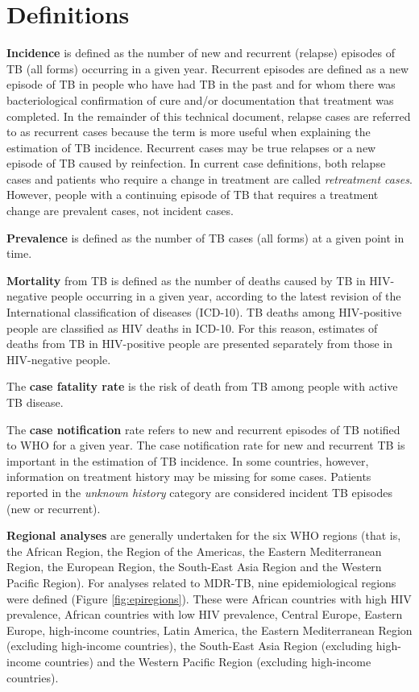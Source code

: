 \section{Definitions}
\textbf{Incidence} is defined as the number of new and recurrent (relapse) episodes of TB (all forms) occurring in a given year. Recurrent episodes are defined as a new episode of TB in people who have had TB in the past and for whom there was bacteriological confirmation of cure and/or documentation that treatment was completed. In the remainder of this technical document, relapse cases are referred to as recurrent cases because the term is more useful when explaining the estimation of TB incidence. Recurrent cases may be true relapses or a new episode of TB caused by reinfection. In current case definitions, both relapse cases and patients who require a change in treatment are called \textit{retreatment cases}. However, people with a continuing episode of TB that requires a treatment change are prevalent cases, not incident cases.

\textbf{Prevalence} is defined as the number of TB cases (all forms) at a given point in time. 

\textbf{Mortality} from TB is defined as the number of deaths caused by TB in HIV-negative people occurring in a given year, according to the latest revision of the International classification of diseases (ICD-10). TB deaths among HIV-positive people are classified as HIV deaths in ICD-10. For this reason, estimates of deaths from TB in HIV-positive people are presented separately from those in HIV-negative people.

The \textbf{case fatality rate} is the risk of death from TB among people with active TB disease.

The \textbf{case notification} rate refers to new and recurrent episodes of TB notified to WHO for a given year. The case notification rate for new and recurrent TB is important in the estimation of TB incidence. In some countries, however, information on treatment history may be missing for some cases. Patients reported in the \textit{unknown history} category are considered incident TB episodes (new or recurrent). 

\textbf{Regional analyses} are generally undertaken for the six WHO regions (that is, the African Region, the Region of the Americas, the Eastern Mediterranean Region, the European Region, the South-East Asia Region and the Western Pacific Region). For analyses related to MDR-TB, nine epidemiological regions were defined (Figure \ref{fig:epiregions}). These were African countries with high HIV prevalence, African countries with low HIV prevalence, Central Europe, Eastern Europe, high-income countries, Latin America, the Eastern Mediterranean Region (excluding high-income countries), the South-East Asia Region (excluding high-income countries) and the Western Pacific Region (excluding high-income countries). 


  